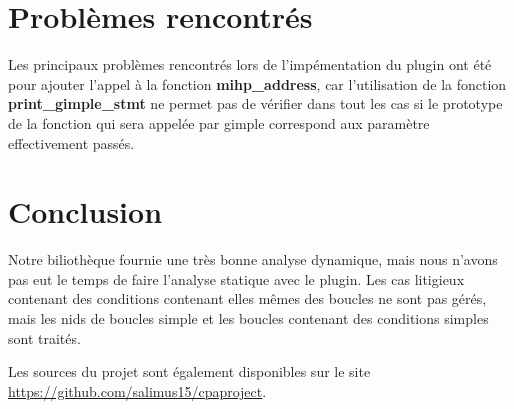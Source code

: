 \documentclass[12pt,french]{article}
\begin{document}
\section{\color{blue}Problèmes rencontrés}

Les principaux problèmes rencontrés lors de l'impémentation du plugin ont été pour ajouter l'appel à la fonction \textbf{mihp\_address}, car l'utilisation de la fonction \textbf{print\_gimple\_stmt} ne permet pas de vérifier dans tout les cas si le prototype de la fonction qui sera appelée par gimple correspond aux paramètre effectivement passés.

\section{\color{blue}Conclusion}

Notre biliothèque fournie une très bonne analyse dynamique, mais nous n'avons pas eut le temps de faire l'analyse statique avec le plugin. Les cas litigieux contenant des conditions contenant elles mêmes des boucles ne sont pas gérés, mais les nids de boucles simple et les boucles contenant des conditions simples sont traités.

Les sources du projet sont également disponibles sur le site \url{https://github.com/salimus15/cpaproject}.
\end{document}
